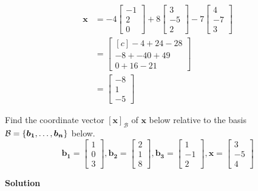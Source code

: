 \documentclass[11pt]{scrartcl}
\theoremstyle{dotlessP}
\theoremstyle{dotlessN}
\DeclarePairedDelimiter\set{\{}{\}}
\newcommand{\basis}{\mathcal{B}}
\begin{document}
\begin{align*}
	\bm{x} &= -4\begin{bmatrix}
	-1 \\
	2 \\
	0
\end{bmatrix} + 
8
\begin{bmatrix}
	3 \\
	-5 \\
	2
\end{bmatrix} -
7
\begin{bmatrix}
	4 \\
	-7 \\
	3
\end{bmatrix} \\
		   &=
		   \begin{bmatrix}[c]
		   	-4 + 24 - 28 \\
			-8 + -40 + 49 \\
			0 + 16- 21 
		   \end{bmatrix} \\
		   &= 
		   \begin{bmatrix}
		   	-8 \\
			1 \\
			-5
		\end{bmatrix}
\end{align*}
\begin{ques}
	Find the coordinate vector $[\bm{x}]_\basis$ of $\bm{x}$ below relative to the basis $\basis = \set*{\bm{b_1}, \dots, \bm{b_n}}$ below.
	\[
		\bm{b_1} = 
		\begin{bmatrix}
			1 \\
			0 \\
			3
		\end{bmatrix},
		\bm{b_2} = 
		\begin{bmatrix}
			2 \\
			1 \\
			8
		\end{bmatrix}, \bm{b_3} = 
		\begin{bmatrix}
			1 \\
			-1 \\
			2
		\end{bmatrix},
		\bm{x} =
		\begin{bmatrix}
			3 \\
			-5 \\
			4
		\end{bmatrix}
	\] 
\end{ques}
\textbf{Solution}
\end{document}
